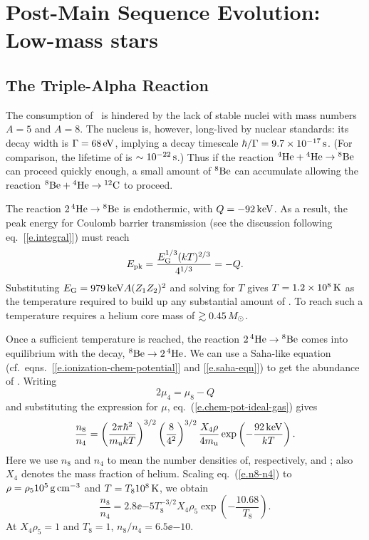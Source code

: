 \chapter{Post-Main Sequence Evolution: Low-mass stars}

\section{The Triple-Alpha Reaction}\label{s.triple-alpha}

The consumption of \helium\ is hindered by the lack of stable nuclei with mass numbers $A=5$ and $A=8$.  
The nucleus \beryllium[8] is, however, long-lived by nuclear standards: its decay width is $\Gamma = 68\nsp\eV$, implying a decay timescale $\hbar/\Gamma = 9.7\ee{-17}\nsp\second$.  (For comparison, the lifetime of \lithium[5] is $\sim 10^{-22}\nsp\second$.)  Thus if the reaction $\helium[4]+\helium[4]\to\beryllium[8]$ can proceed quickly enough, a small amount of $\beryllium[8]$ can accumulate allowing the reaction $\beryllium[8]+\helium\to\carbon$ to proceed.

The reaction $2\nsp\helium\to\beryllium[8]$ is endothermic, with $Q = -92\nsp\keV$.  As a result, the peak energy for Coulomb barrier transmission (see the discussion following eq.~[\ref{e.integral}]) must reach
\[ \Epk = \frac{\EG^{1/3}(kT)^{2/3}}{4^{1/3}} = -Q. \]
Substituting $\EG = 979\nsp\keV A (Z_{1}Z_{2})^{2}$ and solving for $T$ gives $T = 1.2\ee{8}\nsp\K$ as the temperature required to build up any substantial amount of \beryllium[8].  To reach such a temperature requires a helium core mass of $\gtrsim 0.45\nsp\Msun$.

Once a sufficient temperature is reached, the reaction $2\nsp\helium[4]\to\beryllium[8]$ comes into equilibrium with the decay, $\beryllium[8]\to2\nsp\helium$.  We can use a Saha-like equation (cf.\ eqns.~[\ref{e.ionization-chem-potential}] and [\ref{e.saha-eqn}]) to get the abundance of \beryllium[8].  Writing
\[ 2\mu_{4} = \mu_{8} - Q \]
and substituting the expression for $\mu$, eq.~(\ref{e.chem-pot-ideal-gas}) gives
\begin{equation}\label{e.n8-n4}
\frac{n_{8}}{n_{4}} = \left(\frac{2\pi\hbar^{2}}{\mb kT}\right)^{3/2}\left(\frac{8}{4^{2}}\right)^{3/2}\frac{X_{4}\rho}{4\mb}\exp\left(-\frac{92\nsp\keV}{kT}\right).
\end{equation}
Here we use $n_{8}$ and $n_{4}$ to mean the number densities of, respectively, \beryllium[8] and \helium; also $X_{4}$ denotes the mass fraction of helium.
Scaling eq.~(\ref{e.n8-n4}) to $\rho = \rho_{5} 10^{5}\nsp\grampercc$ and $T = T_{8}10^{8}\nsp\K$, we obtain
\begin{equation}\label{e.n8-to-n4}
 \frac{n_{8}}{n_{4}} = 2.8\ee{-5} T_{8}^{-3/2}X_{4}\rho_{5}\exp\left(-\frac{10.68}{T_{8}}\right).
\end{equation}
At $X_{4}\rho_{5}=1$ and $T_{8} = 1$, $n_{8}/n_{4} = 6.5\ee{-10}$.  


